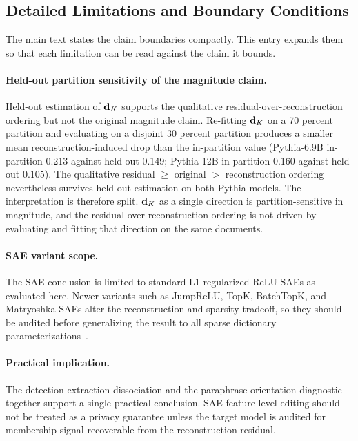 \subsection{Detailed Limitations and Boundary Conditions}
\label{app:limitations_detail}

The main text states the claim boundaries compactly. This entry expands them so that each limitation can be read against the claim it bounds.

\paragraph{Held-out partition sensitivity of the magnitude claim.}
Held-out estimation of $\mathbf{d}_K$ supports the qualitative residual-over-reconstruction ordering but not the original magnitude claim. Re-fitting $\mathbf{d}_K$ on a 70 percent partition and evaluating on a disjoint 30 percent partition produces a smaller mean reconstruction-induced drop than the in-partition value (Pythia-6.9B in-partition 0.213 against held-out 0.149; Pythia-12B in-partition 0.160 against held-out 0.105). The qualitative residual $\geq$ original $>$ reconstruction ordering nevertheless survives held-out estimation on both Pythia models. The interpretation is therefore split. $\mathbf{d}_K$ as a single direction is partition-sensitive in magnitude, and the residual-over-reconstruction ordering is not driven by evaluating and fitting that direction on the same documents.

\paragraph{SAE variant scope.}
The SAE conclusion is limited to standard L1-regularized ReLU SAEs as evaluated here. Newer variants such as JumpReLU, TopK, BatchTopK, and Matryoshka SAEs alter the reconstruction and sparsity tradeoff, so they should be audited before generalizing the result to all sparse dictionary parameterizations~\citep{rajamanoharan2024jumping,gao2025scaling,bussmann2024batchtopk,bussmann2025matryoshka}.

\paragraph{Practical implication.}
The detection-extraction dissociation and the paraphrase-orientation diagnostic together support a single practical conclusion. SAE feature-level editing should not be treated as a privacy guarantee unless the target model is audited for membership signal recoverable from the reconstruction residual.

